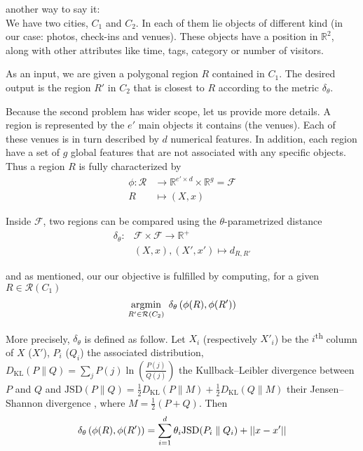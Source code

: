 \begin{comments}
another way to say it:\\
We have two cities, $C_1$ and $C_2$. In each of them lie objects of different
kind (in our case: photos, check-ins and venues). These objects have a
position in $\mathbb{R}^2$, along with other attributes like time, tags,
category or number of visitors.

As an input, we are given a polygonal region $R$ contained in $C_1$. The
desired output is the region $R'$ in $C_2$ that is closest to $R$ according
to the metric $\delta_{\theta}$.

\end{comments}

Because the second problem has wider scope, let us provide more details.
A region is represented by the $e'$ main objects it contains (the venues).
Each of these venues is in turn described by $d$ numerical features. In
addition, each region have a set of $g$ global features that are not
associated with any specific objects. Thus a region $R$ is fully characterized
by
\begin{align*}
	\phi \colon \mathcal{R} &\to
	\mathbb{R}^{e'\times d} \times \mathbb{R}^g = \mathcal{F} \\
	R &\mapsto (X, x)
\end{align*}

Inside $\mathcal{F}$, two regions can be compared using the
$\theta$-parametrized distance
\begin{align*}
	\delta_{\theta} \colon &\mathcal{F} \times \mathcal{F} \to
	\mathbb{R}^+ \\
	&(X, x) , (X', x') \mapsto d_{R,R'}
\end{align*}

and as mentioned, our our objective is fulfilled by computing, for a given $R
\in \mathcal{R}(C_1)$
\begin{equation}
	\operatorname*{argmin}_{R' \in \mathcal{R}(C_2)}\; \delta_{\theta}
	\left(\phi(R), \phi(R')\right)
	\label{e:onetheta}
\end{equation}

More precisely, $\delta_{\theta}$ is defined as follow. Let $X_i$ (respectively
$X'_i$) be the $i$\textsuperscript{th} column of $X$ ($X'$), $P_i$ ($Q_i$) the
associated distribution, $D_{\mathrm{KL}}(P \parallel Q) = \sum_j
P(j)\ln\left(\frac{P(j)}{Q(j)}\right)$ the Kullback--Leibler divergence
between $P$ and $Q$ and $ \mathrm{JSD}(P \parallel Q)=
\frac{1}{2}D_{\mathrm{KL}}(P \parallel M)+\frac{1}{2}D_{\mathrm{KL}}(Q
\parallel M)$ their Jensen--Shannon divergence \autocite{JensenShannon03},
where $M=\frac{1}{2}(P+Q)$. Then
\[
	\delta_{\theta} \left(\phi(R), \phi(R')\right) = \sum_{i=1}^d
	\theta_i \mathrm{JSD}(P_i \parallel Q_i) + \left|\left|x - x'\right|\right|
\]

